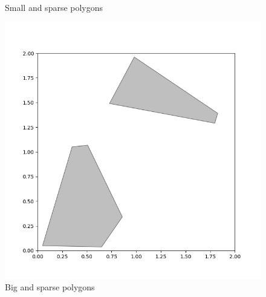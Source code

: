 \documentclass{article}
\begin{document}
\begin{figure}[htbp]
\begin{minipage}{0.45\textwidth}
    \caption{Small and sparse polygons}
  \end{minipage}\hfill
  \begin{minipage}{0.45\textwidth}
    \includegraphics[width=\linewidth]{part1_big_sparse.png}
    \caption{Big and sparse polygons}
  \end{minipage}
\end{figure}
\end{document}
